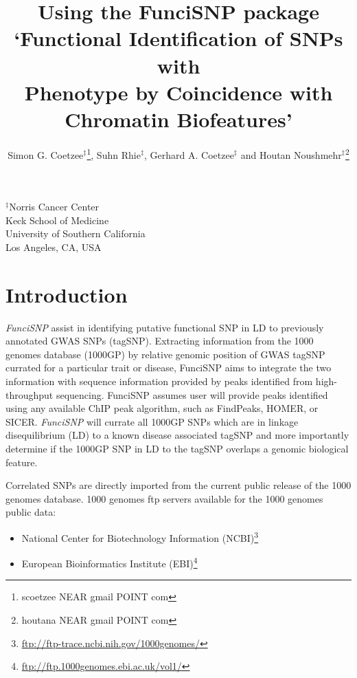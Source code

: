 \documentclass[12pt,fullpage]{article}
\author{Simon G. Coetzee$^\ddagger$\footnote{scoetzee NEAR gmail POINT com},
    Suhn Rhie$^\ddagger$, Gerhard A. Coetzee$^\ddagger$ and Houtan
        Noushmehr$^\ddagger$\footnote{houtana NEAR gmail POINT com}}
\newcommand{\Rpackage}[1]{{\textit{#1}}}
\begin{document}
\title{Using the FunciSNP package\\`Functional Identification of SNPs with\\
Phenotype by Coincidence with Chromatin Biofeatures'}
\maketitle
\begin{center}
$^\ddagger$Norris Cancer Center\\Keck School of Medicine\\University of Southern
California\\Los Angeles, CA, USA
\end{center}
\tableofcontents
\section{Introduction}

\Rpackage{FunciSNP} assist in identifying putative functional SNP in LD to
previously annotated GWAS SNPs (tagSNP). Extracting information from the 1000
genomes database (1000GP) by relative genomic position of GWAS tagSNP currated
for a particular trait or disease, FunciSNP aims to integrate the two
information with sequence information provided by peaks identified from
high-throughput sequencing. FunciSNP assumes user will provide peaks identified
using any available ChIP peak algorithm, such as FindPeaks, HOMER, or SICER.
\Rpackage{FunciSNP} will currate all 1000GP SNPs which are in linkage
disequilibrium (LD) to a known disease associated tagSNP and more importantly
determine if the 1000GP SNP in LD to the tagSNP overlaps a genomic biological
feature.

Correlated SNPs are
directly imported from the current public release of the 1000 genomes database.
1000 genomes ftp servers available for the 1000 genomes public data: 

\begin{itemize}
\item National Center for Biotechnology Information
(NCBI)\footnote{\url{ftp://ftp-trace.ncbi.nih.gov/1000genomes/}}
\item European Bioinformatics Institute
(EBI)\footnote{\url{ftp://ftp.1000genomes.ebi.ac.uk/vol1/}}
\end{itemize}
\end{document}
